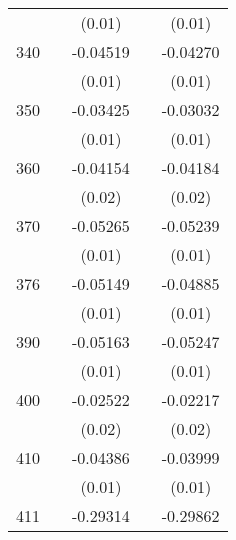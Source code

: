 \begin{table}[htbp]
\begin{tabular}{l*{4}{c}}
                    &                     &      (0.01)         &                     &      (0.01)         \\
340                 &                     &    -0.04519\sym{***}&                     &    -0.04270\sym{***}\\
                    &                     &      (0.01)         &                     &      (0.01)         \\
350                 &                     &    -0.03425\sym{***}&                     &    -0.03032\sym{**} \\
                    &                     &      (0.01)         &                     &      (0.01)         \\
360                 &                     &    -0.04154\sym{**} &                     &    -0.04184\sym{**} \\
                    &                     &      (0.02)         &                     &      (0.02)         \\
370                 &                     &    -0.05265\sym{***}&                     &    -0.05239\sym{***}\\
                    &                     &      (0.01)         &                     &      (0.01)         \\
376                 &                     &    -0.05149\sym{***}&                     &    -0.04885\sym{***}\\
                    &                     &      (0.01)         &                     &      (0.01)         \\
390                 &                     &    -0.05163\sym{***}&                     &    -0.05247\sym{***}\\
                    &                     &      (0.01)         &                     &      (0.01)         \\
400                 &                     &    -0.02522         &                     &    -0.02217         \\
                    &                     &      (0.02)         &                     &      (0.02)         \\
410                 &                     &    -0.04386\sym{***}&                     &    -0.03999\sym{***}\\
                    &                     &      (0.01)         &                     &      (0.01)         \\
411                 &                     &    -0.29314         &                     &    -0.29862         \\

\end{tabular}
\end{table}
